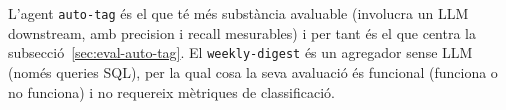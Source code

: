 L'agent \texttt{auto-tag} és el que té més substància avaluable (involucra un LLM downstream, amb precision i recall mesurables) i per tant és el que centra la subsecció~\ref{sec:eval-auto-tag}. El \texttt{weekly-digest} és un agregador sense LLM (només queries SQL), per la qual cosa la seva avaluació és funcional (funciona o no funciona) i no requereix mètriques de classificació.

\label{sec:graphify-limitations}


%
%


